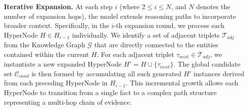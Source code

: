 
\textbf{Iterative Expansion.} At each step $i$ (where $2 \le i \le N$, and $N$ denotes the number of expansion hops), the model extends reasoning paths to incorporate broader context. Specifically, in the $i$-th expansion round, we process each HyperNode $H \in H_{i-1}$ individually. We identify a set of adjacent triplets $\mathcal{T}_{adj}$ from the Knowledge Graph $\mathcal{G}$ that are directly connected to the entities contained within the current $H$. For each adjacent triplet $\tau_{next} \in \mathcal{T}_{adj}$, we instantiate a new expanded HyperNode $H' = H \cup \{\tau_{next}\}$. The global candidate set $\mathcal{C}_{cand}$ is then formed by accumulating all such generated $H'$ instances derived from each preceding HyperNode in $H_{i-1}$. This incremental growth allows each HyperNode to transition from a single fact to a complex path structure representing a multi-hop chain of evidence.


